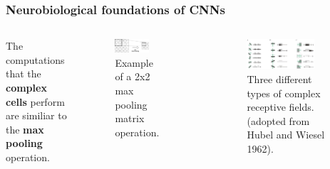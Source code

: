 \documentclass[a4paper,9pt]{beamer}
\theoremstyle{mytheoremstyle}
\begin{document}
\begin{frame}
\frametitle{Neurobiological foundations of CNNs}
\begin{columns}
\scriptsize{
\begin{exampleblock}{}
The computations that the \textbf{complex cells} perform are similiar to the \textbf{max pooling} operation.
\end{exampleblock}
}
\begin{figure}
\begin{center}
  \includegraphics[width=0.75\textwidth]{res/max_pooling.png}
\end{center}
	\caption{Example of a 2x2 max pooling matrix operation.}
\end{figure}
\hrule
\begin{figure}
\begin{center}
  \includegraphics[width=0.75\textwidth]{res/complex_cells.png}
\end{center}
	\caption{Three different types of complex receptive fields. (adopted from Hubel and Wiesel 1962).}
\end{figure}
\end{columns}
\end{frame}
\end{document}
